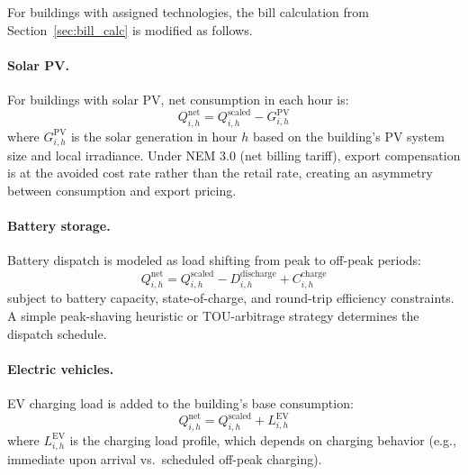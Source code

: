 For buildings with assigned technologies, the bill calculation from Section~\ref{sec:bill_calc} is modified as follows.

\paragraph{Solar PV.}
For buildings with solar PV, net consumption in each hour is:
\begin{equation}
Q_{i,h}^{\text{net}} = Q_{i,h}^{\text{scaled}} - G_{i,h}^{\text{PV}}
\end{equation}
where $G_{i,h}^{\text{PV}}$ is the solar generation in hour $h$ based on the building's PV system size and local irradiance. Under NEM 3.0 (net billing tariff), export compensation is at the avoided cost rate rather than the retail rate, creating an asymmetry between consumption and export pricing.


\paragraph{Battery storage.}
Battery dispatch is modeled as load shifting from peak to off-peak periods:
\begin{equation}
Q_{i,h}^{\text{net}} = Q_{i,h}^{\text{scaled}} - D_{i,h}^{\text{discharge}} + C_{i,h}^{\text{charge}}
\end{equation}
subject to battery capacity, state-of-charge, and round-trip efficiency constraints. A simple peak-shaving heuristic or TOU-arbitrage strategy determines the dispatch schedule.


\paragraph{Electric vehicles.}
EV charging load is added to the building's base consumption:
\begin{equation}
Q_{i,h}^{\text{net}} = Q_{i,h}^{\text{scaled}} + L_{i,h}^{\text{EV}}
\end{equation}
where $L_{i,h}^{\text{EV}}$ is the charging load profile, which depends on charging behavior (e.g., immediate upon arrival vs.\ scheduled off-peak charging).


